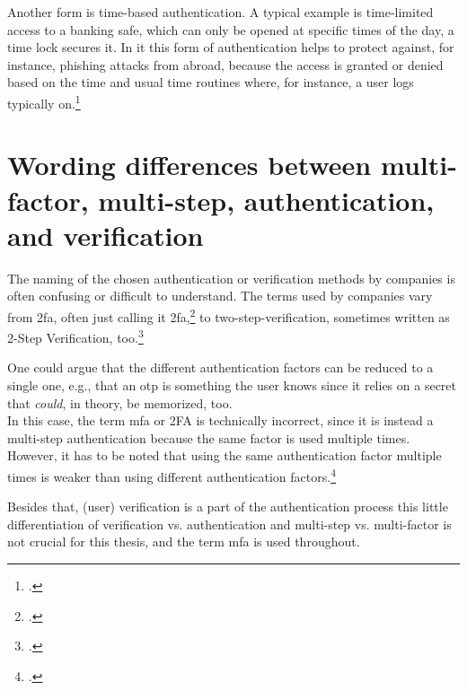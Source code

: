 Another form is time-based authentication. A typical example is time-limited access to a banking safe, which can only be opened at specific times of the day, a time lock secures it. In \gls{it} this form of authentication helps to protect against, for instance, phishing attacks from abroad, because the access is granted or denied based on the time and usual time routines where, for instance, a user logs typically on.\footcite[See][191]{dasgupta2017multi}

\section{Wording differences between multi-factor, multi-step, authentication, and verification}

The naming of the chosen authentication or verification methods by companies is often confusing or difficult to understand. The terms used by companies vary from \gls{2fa}, often just calling it \gls{2fa},\footcite{apple_2fa} to two-step-verification, sometimes written as 2-Step Verification, too.\footcites[][]{apple_s2v}[][]{playstation}[][]{google_2-step_verification}[][]{microsoft_2sv}

One could argue that the different authentication factors can be reduced to a single one, e.g., that an \gls{otp} is \frqq something the user knows\flqq{} since it relies on a secret that \textit{could}, in theory, be memorized, too.\\
In this case, the term \gls{mfa} or 2FA is technically incorrect, since it is instead a multi-step authentication because the same factor is used multiple times. However, it has to be noted that using the same authentication factor multiple times is weaker than using different authentication factors.\footcite[See][117]{grimes2017hacking}

Besides that, (user) verification is a part of the authentication process this little differentiation of verification vs. authentication and multi-step vs. multi-factor is not crucial for this thesis, and the term \gls{mfa} is used throughout.

